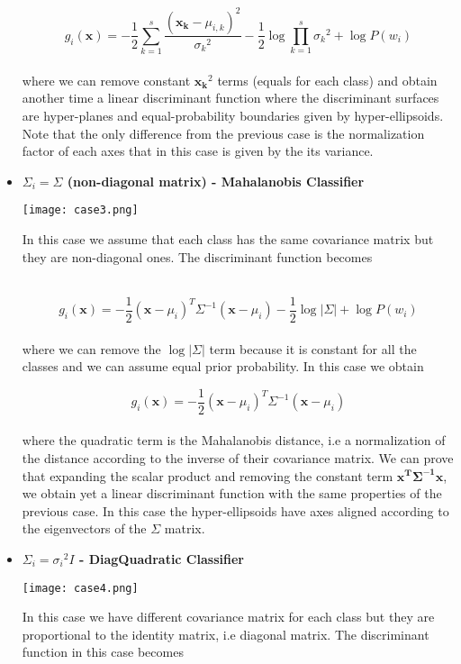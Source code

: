 \documentclass{standalone}
\begin{document}
\begin{itemize}
$$
g_i(\mathbf{x}) = -\frac{1}{2}\sum_{k=1}^{s}\frac{(\mathbf{x_k}-\mu_{i,k})^2}{{\sigma_k}^2}-\frac{1}{2}\log\prod_{k=1}^{s}{\sigma_k}^2+\log P(w_i)
$$
\\
where we can remove constant $\mathbf{x_k}^2$ terms (equals for each class) and obtain another time a linear discriminant function where the discriminant surfaces are hyper-planes and equal-probability boundaries given by hyper-ellipsoids.
Note that the only difference from the previous case is the normalization factor of each axes that in this case is given by the its variance.


\item \textbf{$\Sigma_i = \Sigma$ (non-diagonal matrix) - Mahalanobis Classifier}

\begin{minipage}{.30\textwidth}
\hspace{-.5cm}
\texttt{[image: case3.png]}
\end{minipage}%
\begin{minipage}{.70\textwidth}
In this case we assume that each class has the same covariance matrix but they are non-diagonal ones.
The discriminant function becomes
\end{minipage}\\

$$
g_i(\mathbf{x}) = -\frac{1}{2}(\mathbf{x}-\mu_i)^T{\Sigma}^{-1}(\mathbf{x}-\mu_i) -\frac{1}{2}\log\left|\Sigma\right|+\log P(w_i)
$$
\\
where we can remove the $\log\left|\Sigma\right|$ term because it is constant for all the classes and we can assume equal prior probability.
In this case we obtain

$$
g_i(\mathbf{x}) = -\frac{1}{2}(\mathbf{x}-\mu_i)^T{\Sigma}^{-1}(\mathbf{x}-\mu_i)
$$
\\
where the quadratic term is the Mahalanobis distance, i.e a normalization of the distance according to the inverse of their covariance matrix.
We can prove that expanding the scalar product and removing the constant term $\mathbf{x^T\Sigma^{-1}x}$, we obtain yet a linear discriminant function with the same properties of the previous case.
In this case the hyper-ellipsoids have axes aligned according to the eigenvectors of the $\Sigma$ matrix.


\item \textbf{$\Sigma_i = {\sigma_i}^2I$ - DiagQuadratic Classifier}

\begin{minipage}{.30\textwidth}
\hspace{-.5cm}
\texttt{[image: case4.png]}
\end{minipage}%
\begin{minipage}{.70\textwidth}
In this case we have different covariance matrix for each class but they are proportional to the identity matrix, i.e diagonal matrix.
The discriminant function in this case becomes
\end{minipage}\\


\end{itemize}
\end{document}
